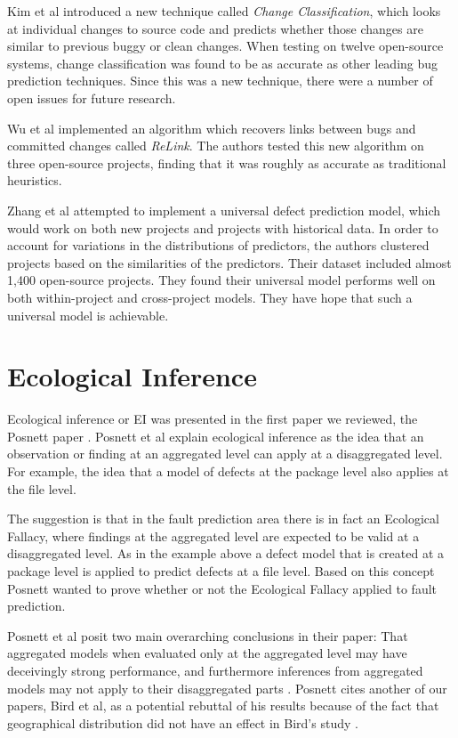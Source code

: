\documentclass{sig-alternate-05-2015}
\begin{document}
Kim et al \cite{Kim} introduced a new technique called \textit{Change Classification}, which looks at individual changes to source code and predicts whether those changes are similar to previous buggy or clean changes. When testing on twelve open-source systems, change classification was found to be as accurate as other leading bug prediction techniques. Since this was a new technique, there were a number of open issues for future research.

Wu et al \cite{Wu} implemented an algorithm which recovers links between bugs and committed changes called \textit{ReLink}. The authors tested this new algorithm on three open-source projects, finding that it was roughly as accurate as traditional heuristics. 

Zhang et al \cite{Zhang2014} attempted to implement a universal defect prediction model, which would work on both new projects and projects with historical data. In order to account for variations in the distributions of predictors, the authors clustered projects based on the similarities of the predictors. Their dataset included almost 1,400 open-source projects. They found their universal model performs well on both within-project and cross-project models. They have hope that such a universal model is achievable. 

\section{Ecological Inference}
Ecological inference or EI was presented in the first paper we reviewed, the Posnett paper \cite{Posnett}.  Posnett et al explain ecological inference as the idea that an observation or finding at an aggregated level can apply at a disaggregated level.  For example, the idea that a model of defects at the package level also applies at the file level.  

The suggestion is that in the fault prediction area there is in fact an Ecological Fallacy, where findings at the aggregated level are expected to be valid at a disaggregated level.  As in the example above a defect model that is created at a package level is applied to predict defects at a file level. Based on this concept Posnett wanted to prove whether or not the Ecological Fallacy applied to fault prediction. 

Posnett et al posit two main overarching conclusions in their paper:  That aggregated models when evaluated only at the aggregated level may have deceivingly strong performance, and furthermore inferences from aggregated models may not apply to their disaggregated parts \cite{Posnett}.  Posnett cites another of our papers, Bird et al, as a potential rebuttal of his results because of the fact that geographical distribution did not have an effect in Bird's study \cite{Bird}.
\end{document}
